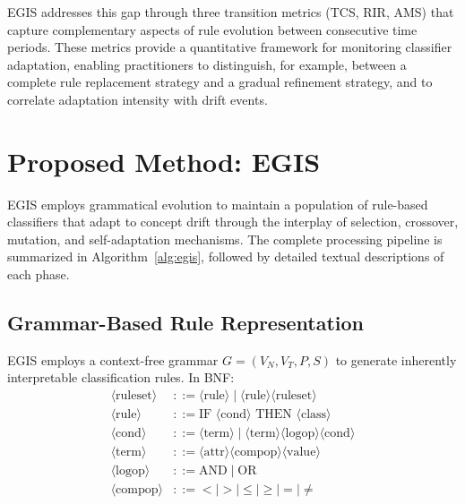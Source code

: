 \documentclass[lettersize,journal]{IEEEtran}
\begin{document}
EGIS addresses this gap through three transition metrics (TCS, RIR, AMS) that capture complementary aspects of rule evolution between consecutive time periods. These metrics provide a quantitative framework for monitoring classifier adaptation, enabling practitioners to distinguish, for example, between a complete rule replacement strategy and a gradual refinement strategy, and to correlate adaptation intensity with drift events.


\section{Proposed Method: EGIS}
\label{sec:method}

EGIS employs grammatical evolution to maintain a population of rule-based classifiers that adapt to concept drift through the interplay of selection, crossover, mutation, and self-adaptation mechanisms. The complete processing pipeline is summarized in Algorithm~\ref{alg:egis}, followed by detailed textual descriptions of each phase.

\subsection{Grammar-Based Rule Representation}

EGIS employs a context-free grammar $G = (V_N, V_T, P, S)$ to generate inherently interpretable classification rules. In BNF:
\begin{align}
    \langle \text{ruleset} \rangle &::= \langle \text{rule} \rangle \mid \langle \text{rule} \rangle \langle \text{ruleset} \rangle \nonumber \\
    \langle \text{rule} \rangle &::= \text{IF } \langle \text{cond} \rangle \text{ THEN } \langle \text{class} \rangle \nonumber \\
    \langle \text{cond} \rangle &::= \langle \text{term} \rangle \mid \langle \text{term} \rangle \langle \text{logop} \rangle \langle \text{cond} \rangle \nonumber \\
    \langle \text{term} \rangle &::= \langle \text{attr} \rangle \langle \text{compop} \rangle \langle \text{value} \rangle \nonumber \\
    \langle \text{logop} \rangle &::= \text{AND} \mid \text{OR} \nonumber \\
    \langle \text{compop} \rangle &::= < \mid > \mid \leq \mid \geq \mid = \mid \neq
\end{align}
\end{document}
